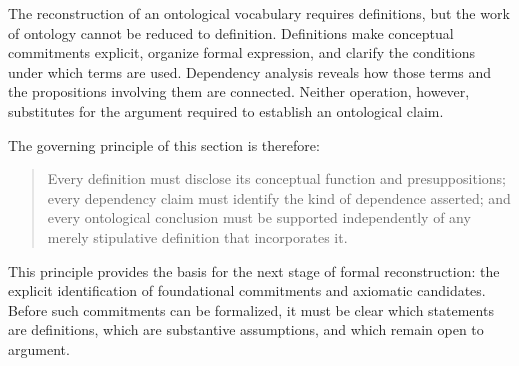The reconstruction of an ontological vocabulary requires
definitions, but the work of ontology cannot be reduced to
definition. Definitions make conceptual commitments explicit,
organize formal expression, and clarify the conditions under
which terms are used. Dependency analysis reveals how those
terms and the propositions involving them are connected.
Neither operation, however, substitutes for the argument
required to establish an ontological claim.

The governing principle of this section is therefore:

\begin{quote}
Every definition must disclose its conceptual function and
presuppositions; every dependency claim must identify the
kind of dependence asserted; and every ontological conclusion
must be supported independently of any merely stipulative
definition that incorporates it.
\end{quote}

This principle provides the basis for the next stage of formal
reconstruction: the explicit identification of foundational
commitments and axiomatic candidates. Before such commitments
can be formalized, it must be clear which statements are
definitions, which are substantive assumptions, and which
remain open to argument.

